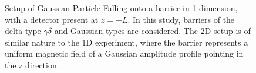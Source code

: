\begin{figure}
    \caption{Setup of Gaussian Particle Falling onto a barrier in 1 dimension, with a detector present at $z=-L$. In this study, barriers of the delta type $\gamma \delta$ and Gaussian types are considered. The 2D setup is of similar nature to the 1D experiment, where the barrier represents a uniform magnetic field of a Gaussian amplitude profile pointing in the z direction.}
    \label{fig:1d_setup}
\end{figure}

